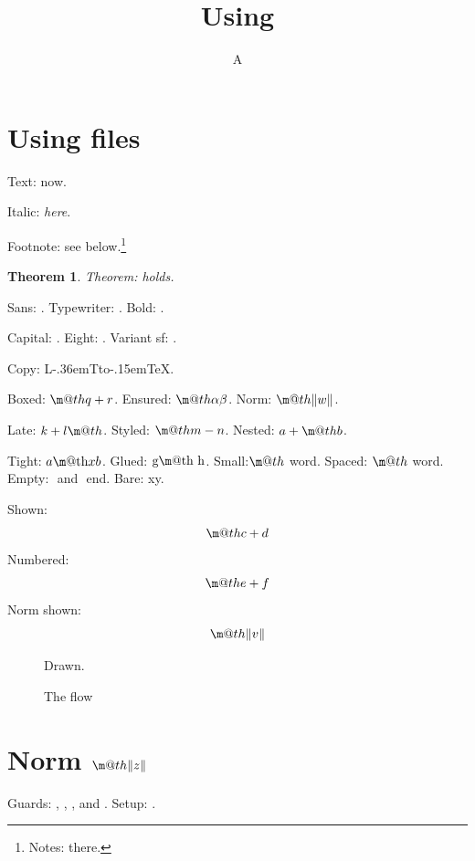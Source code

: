\documentclass{article}
\title{Using \hologo{BibTeX}}
\author{A}
\date{}
\makeatletter
\newtheorem{theorem}{Theorem}
\newcommand\OldLaTeX{L\kern-.36em{\setbox0\hbox{T}\vbox to\ht0{\hbox{$\m@th$\csname S@\f@size\endcsname\fontsize\sf@size\z@\math@fontsfalse\selectfont A}\vss}}\kern-.15em\TeX}
\newcommand\Boxed{\mbox{$\m@th q+r$}}
\newcommand\Ensured{\ensuremath{\m@th\alpha\beta}}
\newcommand{\nrm}[1]{\m@th\lVert #1\rVert}
\newcommand\Late{$k+l\m@th$}
\newcommand\Styled{\hbox{$\displaystyle\m@th m-n$}}
\newcommand\Shown{\[\m@th c+d\]}
\newcommand\Numbered{\begin{equation}\m@th e+f\end{equation}}
\newcommand\Nested{$a+\mbox{$\m@th b$}$}
\newcommand\Tight{\hbox{\m@th$x$}}
\newcommand\Glued{\text{g\m@th h}}
\newcommand\Small{{\small $\m@th$ word}}
\makeatother
\begin{document}
\maketitle
\tableofcontents
\listoffigures
\section{Using  files}
Text:  now.

Italic: \emph{ here}.

Footnote: see below.\footnote{Notes:  there.}

\begin{theorem}
Theorem:  holds.
\end{theorem}

Sans: \textsf{}. Typewriter: \texttt{}. Bold: \textbf{}.

Capital: . Eight: . Variant sf: .

Copy: \OldLaTeX.

Boxed: \Boxed. Ensured: \Ensured. Norm: $\nrm{w}$.

Late: \Late. Styled: \Styled. Nested: \Nested.

Tight: $a\Tight b$. Glued: $\Glued$. Small:\Small. Spaced: \Small. Empty: $ $ and \( \) end. Bare: x$ $y.

Shown: \Shown
Numbered: \Numbered
Norm shown: \[\nrm{v}\]

\begin{figure}
\centering Drawn.
\caption{The  flow}
\end{figure}

\section{Norm $\nrm{z}$}

Guards: , , , and .
{Setup: .}
\end{document}
